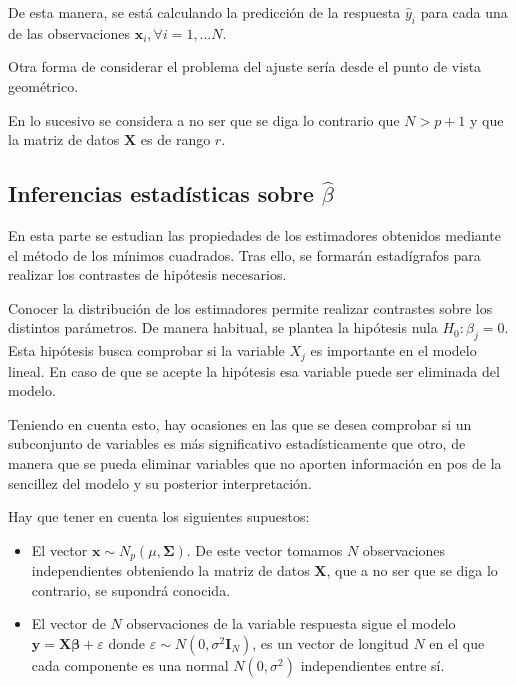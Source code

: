 \noindent De esta manera, se está calculando la predicción de la respuesta $\hat{y}_i$ para cada una de las observaciones $\mathbf{x}_i, \forall i =1, \ldots N$. 

\noindent Otra forma de considerar el problema del ajuste sería desde el punto de vista geométrico.

\noindent En lo sucesivo se considera a no ser que se diga lo contrario que $N>p+1$ y que la matriz de datos $\mathbf{X}$ es de rango $r$.


\subsection{Inferencias estadísticas sobre $\hat{\beta}$}

\noindent En esta parte se estudian las propiedades de los estimadores obtenidos mediante el método de los mínimos cuadrados. Tras ello, se formarán estadígrafos para realizar los contrastes de hipótesis necesarios.

\noindent Conocer la distribución de los estimadores permite realizar contrastes sobre los distintos parámetros. De manera habitual, se plantea la hipótesis nula $H_0: \beta_j=0 $. Esta hipótesis busca comprobar si la variable $X_j$ es importante en el modelo lineal. En caso de que se acepte la hipótesis esa variable puede ser eliminada del modelo. 

\noindent Teniendo en cuenta esto,  hay ocasiones en las que se desea comprobar si un subconjunto de variables es más significativo estadísticamente que otro, de manera que se pueda eliminar variables que no aporten información en pos de la sencillez del modelo y su posterior interpretación. 


\newpage
\noindent Hay que tener en cuenta los siguientes supuestos:
\begin{itemize}
\item El vector  $\mathbf{x}\sim N_p(\mu, \mathbf{\Sigma})$. De este vector tomamos $N$ observaciones independientes obteniendo la matriz de datos $\mathbf{X}$, que a no ser que se diga lo contrario, se supondrá conocida.
\item El vector de $N$ observaciones de la variable respuesta sigue el modelo \\$\mathbf{y}= \mathbf{X \beta}+\varepsilon$ donde $\varepsilon \sim N(0,\sigma^2\mathbf{I}_N)$, es un vector de longitud $N$ en el que cada componente es una normal $N(0,\sigma^2)$  independientes entre sí.
\end{itemize}

